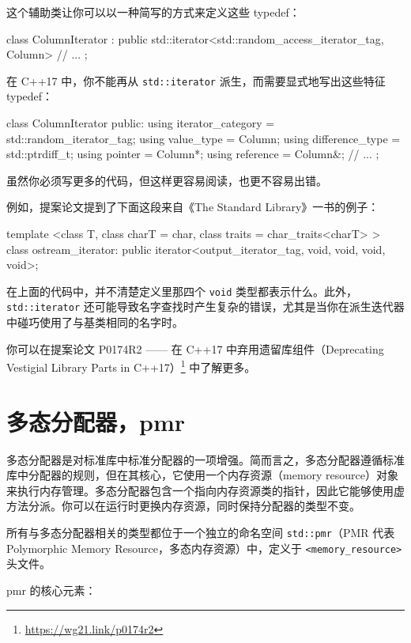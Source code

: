 这个辅助类让你可以以一种简写的方式来定义这些 typedef：

\begin{codebox}[cpp]
class ColumnIterator
: public std::iterator<std::random_access_iterator_tag, Column>
{
// ...
};
\end{codebox}

在 C++17 中，你不能再从 \texttt{std::iterator} 派生，而需要显式地写出这些特征 typedef：

\begin{codebox}[cpp]
class ColumnIterator {
public:
using iterator_category = std::random_iterator_tag;
using value_type = Column;
using difference_type = std::ptrdiff_t;
using pointer = Column*;
using reference = Column&;
// ...
};
\end{codebox}

虽然你必须写更多的代码，但这样更容易阅读，也更不容易出错。

例如，提案论文提到了下面这段来自《The Standard Library》一书的例子：

\begin{codebox}[cpp]
template <class T, class charT = char, class traits = char_traits<charT> >
class ostream_iterator:
public iterator<output_iterator_tag, void, void, void, void>;
\end{codebox}

在上面的代码中，并不清楚定义里那四个 \texttt{void} 类型都表示什么。此外，\texttt{std::iterator} 还可能导致名字查找时产生复杂的错误，尤其是当你在派生迭代器中碰巧使用了与基类相同的名字时。

你可以在提案论文 P0174R2 —— 在 C++17 中弃用遗留库组件（Deprecating Vestigial Library Parts in C++17）\footnote{\url{https://wg21.link/p0174r2}} 中了解更多。


\section{多态分配器，pmr}

多态分配器是对标准库中标准分配器的一项增强。简而言之，多态分配器遵循标准库中分配器的规则，但在其核心，它使用一个内存资源（memory resource）对象来执行内存管理。多态分配器包含一个指向内存资源类的指针，因此它能够使用虚方法分派。你可以在运行时更换内存资源，同时保持分配器的类型不变。

所有与多态分配器相关的类型都位于一个独立的命名空间 \texttt{std::pmr}（PMR 代表 Polymorphic Memory Resource，多态内存资源）中，定义于 \texttt{<memory\_resource>} 头文件。

pmr 的核心元素：

